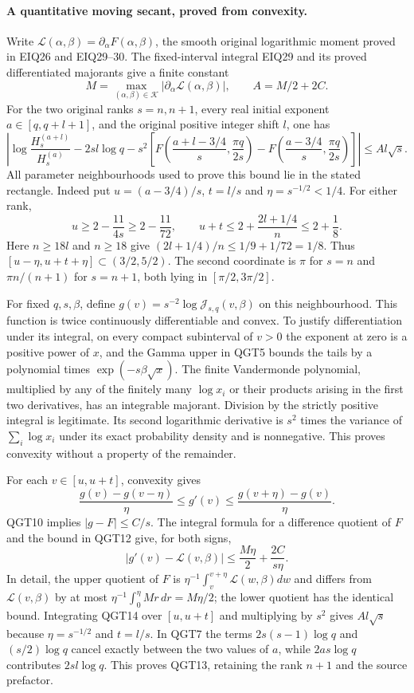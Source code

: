 \paragraph{A quantitative moving secant, proved from convexity.}
Write $\mathcal L(\alpha,\beta)=\partial_\alpha F(\alpha,\beta)$,
the smooth original logarithmic moment proved in EIQ26 and EIQ29--30.
The fixed-interval integral EIQ29 and its proved differentiated
majorants give a finite constant
\[
 M=\max_{(\alpha,\beta)\in\mathcal K}
                   |\partial_\alpha\mathcal L(\alpha,\beta)|,
 \qquad A=M/2+2C.
 \tag{QGT12}
\]
For the two original ranks $s=n,n+1$, every real initial exponent
$a\in[q,q+l+1]$, and the original positive integer shift $l$, one has
\[
 \boxed{\left|\log\frac{H_s^{(a+l)}}{H_s^{(a)}}-2sl\log q
 -s^2\left[F\left(\frac{a+l-3/4}{s},\frac{\pi q}{2s}\right)
           -F\left(\frac{a-3/4}{s},\frac{\pi q}{2s}\right)\right]
                         \right|\le A l\sqrt s.}
 \tag{QGT13}
\]
All parameter neighbourhoods used to prove this bound lie in the
stated rectangle. Indeed put $u=(a-3/4)/s$, $t=l/s$ and
$\eta=s^{-1/2}<1/4$. For either rank,
\[
 u\ge2-\frac{11}{4s}\ge2-\frac{11}{72},\qquad
 u+t\le2+\frac{2l+1/4}{n}\le2+\frac18.
\]
Here $n\ge18l$ and $n\ge18$ give
$(2l+1/4)/n\le1/9+1/72=1/8$. Thus
$[u-\eta,u+t+\eta]\subset(3/2,5/2)$.
The second coordinate is $\pi$ for $s=n$ and $\pi n/(n+1)$ for
$s=n+1$, both lying in $[\pi/2,3\pi/2]$.

For fixed $q,s,\beta$, define
$g(v)=s^{-2}\log\mathcal J_{s,q}(v,\beta)$ on this neighbourhood.
This function is twice continuously differentiable and convex.
To justify differentiation under its integral, on every compact
subinterval of $v>0$ the exponent at zero is a positive power of
$x$, and the Gamma upper in QGT5 bounds the tails by a polynomial
times $\exp(-s\beta\sqrt x)$. The finite Vandermonde polynomial,
multiplied by any of the finitely many $\log x_i$ or their products
arising in the first two derivatives, has an integrable majorant.
Division by the strictly positive integral is legitimate. Its second
logarithmic derivative is $s^2$ times the variance of
$\sum_i\log x_i$ under its exact probability density and is
nonnegative. This proves convexity without a property of the remainder.

For each $v\in[u,u+t]$, convexity gives
\[
 \frac{g(v)-g(v-\eta)}{\eta}\le g'(v)
              \le\frac{g(v+\eta)-g(v)}{\eta}.
\]
QGT10 implies $|g-F|\le C/s$. The integral formula for a difference
quotient of $F$ and the bound in QGT12 give, for both signs,
\[
 |g'(v)-\mathcal L(v,\beta)|
          \le\frac{M\eta}{2}+\frac{2C}{s\eta}.
 \tag{QGT14}
\]
In detail, the upper quotient of $F$ is
$\eta^{-1}\int_v^{v+\eta}\mathcal L(w,\beta)dw$ and differs
from $\mathcal L(v,\beta)$ by at most
$\eta^{-1}\int_0^\eta Mr\,dr=M\eta/2$; the lower quotient
has the identical bound. Integrating QGT14 over $[u,u+t]$ and
multiplying by $s^2$ gives $Al\sqrt s$ because
$\eta=s^{-1/2}$ and $t=l/s$. In QGT7 the terms
$2s(s-1)\log q$ and $(s/2)\log q$ cancel exactly between the
two values of $a$, while $2as\log q$ contributes $2sl\log q$.
This proves QGT13, retaining the rank $n+1$ and the source prefactor.

